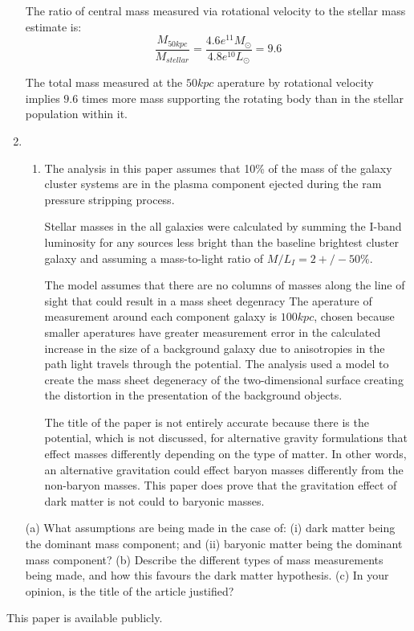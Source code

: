 \documentclass{paper}
\begin{document}
\begin{enumerate}
      The ratio of central mass measured via rotational velocity to the
      stellar mass estimate is:
      \[
        \frac{M_{50 \si{kpc}}}{M_{stellar}} = 
        \frac{4.6e^{11} M_{\odot}}{4.8e^{10} L_{\odot}} = 9.6
      \]

      The total mass measured at the \(50 \si{kpc}\) aperature by rotational
      velocity implies \(9.6\) times more mass supporting the rotating body
      than in the stellar population within it.

    \item
      \begin{enumerate}
        \item
          The analysis in this paper assumes that 10\% of the mass of the
          galaxy cluster systems are in the plasma component ejected during
          the ram pressure stripping process. 

          Stellar masses in the all galaxies were calculated by summing the
          I-band luminosity for any sources less bright than the baseline
          brightest cluster galaxy and assuming a mass-to-light ratio of
          \(M/L_I = 2 +/- 50\%\)\cite{Clowe_2006}.

          The model assumes that there are no columns of masses along the
          line of sight that could result in a mass sheet degenracy
          The aperature of measurement around each component galaxy is 
          \(100 kpc\), chosen because smaller aperatures have greater
          measurement error in the calculated increase in the size of a
          background galaxy due to anisotropies in the path light travels
          through the potential.  The analysis used a model to create the 
          mass sheet degeneracy of the two-dimensional surface creating the 
          distortion in the presentation of the background objects. 

          The title of the paper is not entirely accurate because there is
          the potential, which is not discussed, for alternative gravity
          formulations that effect masses differently depending on the
          type of matter. In other words, an alternative gravitation could
          effect baryon masses differently from the non-baryon masses. This
          paper does prove that the gravitation effect of dark matter is not
          could to baryonic masses.

          

      \end{enumerate}
      (a) What assumptions are being made in the case of: (i) dark matter being the dominant mass component; and (ii) baryonic matter being the dominant mass component?
(b) Describe the different types of mass measurements being made, and how this favours the dark matter hypothesis.
(c) In your opinion, is the title of the article justified?


\end{enumerate}

This paper is available publicly.\cite{Hayden_Cosmology_Source_Repo}

\pagebreak
\printbibliography
\end{document}
